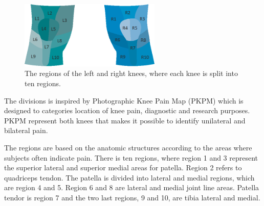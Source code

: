 \begin{figure} [H] 
\centering
\includegraphics[width=0.6\textwidth]{figures/atlas}
\caption{The regions of the left and right knees, where each knee is split into ten regions.}
\label{fig:atlas}
\end{figure}

\noindent
The divisions is inspired by Photographic Knee Pain Map (PKPM) which is designed to categories location of knee pain, diagnostic and research purposes. PKPM represent both knees that makes it possible to identify unilateral and bilateral pain.\citep{Elson2010}

\noindent
The regions are based on the anatomic structures according to the areas where subjects often indicate pain.
There is ten regions, where region 1 and 3 represent the superior lateral and superior medial areas for patella. Region 2 refers to quadriceps tendon. The patella is divided into lateral and medial regions, which are region 4 and 5. Region 6 and 8 are lateral and medial joint line areas. Patella tendor is region 7 and the two last regions, 9 and 10, are tibia lateral and medial.\citep{Elson2010}

\newpage

